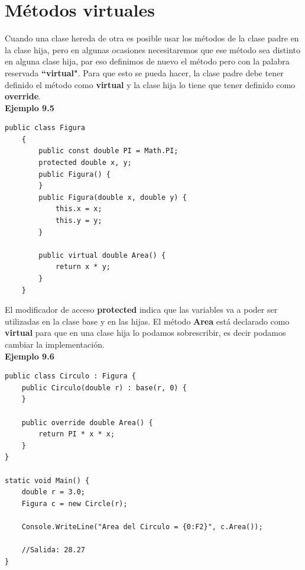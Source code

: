 \documentclass[12pt,a4paper]{report}
\begin{document}
\section{Métodos virtuales}
Cuando una clase hereda de otra es posible usar los métodos de la clase padre en la clase hija, pero en algunas ocasiones necesitaremos que ese método sea distinto en alguna clase hija, par eso definimos de nuevo el método pero con la palabra reservada \textbf{``virtual"}. Para que esto se pueda hacer, la clase padre debe tener definido el método como\textbf{ virtual} y la clase hija lo tiene que tener definido como\textbf{ override}.\\\textbf{Ejemplo 9.5}
\begin{lstlisting}
public class Figura
    {
        public const double PI = Math.PI;
        protected double x, y;
        public Figura() {
        }
        public Figura(double x, double y) {
            this.x = x;
            this.y = y;
        }

        public virtual double Area() {
            return x * y;
        }
    }
\end{lstlisting}El modificador de acceso \textbf{protected} indica que las variables va a poder ser utilizadas en la clase base y en las hijas. El método \textbf{Area} está declarado como \textbf{virtual} para que en una clase hija lo podamos sobrescribir, es decir podamos cambiar la implementación.\\\textbf{Ejemplo 9.6}
\begin{lstlisting}
public class Circulo : Figura {
	public Circulo(double r) : base(r, 0) {
	}

	public override double Area() {
		return PI * x * x;
	}
}

static void Main() {
	double r = 3.0;
	Figura c = new Circle(r);
        
	Console.WriteLine("Area del Circulo = {0:F2}", c.Area());
	
	//Salida: 28.27
}
\end{lstlisting}
\end{document}
